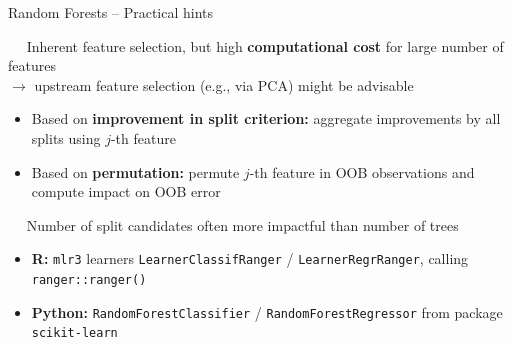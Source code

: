 \begin{frame}{Random Forests -- Practical hints}

 ~~ Inherent feature selection, but high 
\textbf{computational cost} for large number of features \\
$\rightarrow$ upstream feature selection (e.g., via PCA) might be advisable

\medskip


\begin{itemize}
  \item Based on \textbf{improvement in split criterion:} aggregate improvements 
  by all splits using $j$-th feature
  \item Based on \textbf{permutation:} permute $j$-th feature in 
  OOB observations and compute impact on OOB error
\end{itemize}

\medskip

 ~~ Number of split candidates often more impactful than 
number of trees

\medskip


\begin{itemize}
  \item \textbf{R:} \texttt{mlr3} learners \texttt{LearnerClassifRanger} / 
    \texttt{LearnerRegrRanger}, calling \texttt{ranger::ranger()}
  \item \textbf{Python:} \texttt{RandomForestClassifier} / 
  \texttt{RandomForestRegressor} from package \texttt{scikit-learn}
\end{itemize}

\end{frame}